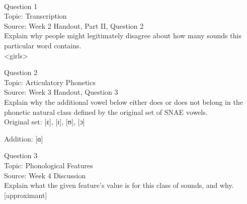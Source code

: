 \documentclass[12pt]{article}
\begin{document}
\newpage

\begin{center}
\textbf{{\color{red}{\HUGE END OF EXAM}}}\\

\end{center}
\newpage

\begin{center}
\textbf{{\color{blue}{\HUGE START OF EXAM\\}}}

\textbf{{\color{blue}{\HUGE Student ID: 71468\\}}}

\textbf{{\color{blue}{\HUGE \\}}}

\end{center}
\newpage

{\large Question 1}\\

Topic: Transcription\\
Source: Week 2 Handout, Part II, Question 2\\

Explain why people might legitimately disagree about how many sounds this particular word contains.\\

<girls>


\newpage

{\large Question 2}\\

Topic: Articulatory Phonetics\\
Source: Week 3 Handout, Question 3\\

Explain why the additional vowel below either does or does not belong in the phonetic natural class defined by the original set of SNAE vowels.\\

Original set: {[ɛ]}, {[ɪ]}, {[ʊ]}, {[ɔ]}

Addition: {[ɑ]}


\newpage

{\large Question 3}\\

Topic: Phonological Features\\
Source: Week 4 Discussion\\

Explain what the given feature’s value is for this class of sounds, and why.\\

{[approximant]}
\end{document}
